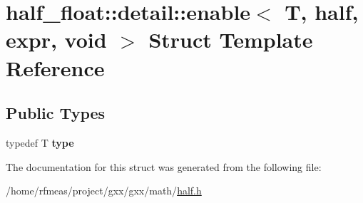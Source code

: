 \hypertarget{structhalf__float_1_1detail_1_1enable_3_01T_00_01half_00_01expr_00_01void_01_4}{}\section{half\+\_\+float\+:\+:detail\+:\+:enable$<$ T, half, expr, void $>$ Struct Template Reference}
\label{structhalf__float_1_1detail_1_1enable_3_01T_00_01half_00_01expr_00_01void_01_4}
\subsection*{Public Types}
\begin{DoxyCompactItemize}
\item 
typedef T {\bfseries type}\hypertarget{structhalf__float_1_1detail_1_1enable_3_01T_00_01half_00_01expr_00_01void_01_4_a382791489c38b31392293c5f660d0689}{}\label{structhalf__float_1_1detail_1_1enable_3_01T_00_01half_00_01expr_00_01void_01_4_a382791489c38b31392293c5f660d0689}

\end{DoxyCompactItemize}


The documentation for this struct was generated from the following file\+:\begin{DoxyCompactItemize}
\item 
/home/rfmeas/project/gxx/gxx/math/\hyperlink{half_8h}{half.\+h}\end{DoxyCompactItemize}
